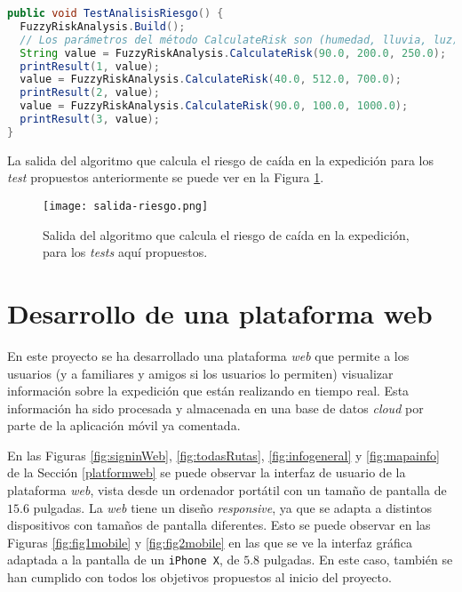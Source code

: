 \begin{lstlisting}[language=java,captionpos=t,caption={\textbf{Cálculo del riesgo de caída en una expedición, para unos valores de humedad, luz y lluvia dados.}},label={lst:hipotetica-riesgo}]
public void TestAnalisisRiesgo() {
  FuzzyRiskAnalysis.Build();
  // Los parámetros del método CalculateRisk son (humedad, lluvia, luz)
  String value = FuzzyRiskAnalysis.CalculateRisk(90.0, 200.0, 250.0);
  printResult(1, value);
  value = FuzzyRiskAnalysis.CalculateRisk(40.0, 512.0, 700.0);
  printResult(2, value);
  value = FuzzyRiskAnalysis.CalculateRisk(90.0, 100.0, 1000.0);
  printResult(3, value);
}
\end{lstlisting}

La salida del algoritmo que calcula el riesgo de caída en la expedición para los \textit{test} propuestos anteriormente se puede ver en la Figura \ref{fig:salida-riesgo}.

\begin{figure}[!h]
\begin{center}
\texttt{[image: salida-riesgo.png]}
\caption{Salida del algoritmo que calcula el riesgo de caída en la expedición, para los \textit{tests} aquí propuestos.}
\label{fig:salida-riesgo}
\end{center}
\end{figure}

\section{Desarrollo de una plataforma web}

En este proyecto se ha desarrollado una plataforma \textit{web} que permite a los usuarios (y a familiares y amigos si los usuarios lo permiten) visualizar información sobre la expedición que están realizando en tiempo real. Esta información ha sido procesada y almacenada en una base de datos \textit{cloud} por parte de la aplicación móvil ya comentada. 

En las Figuras \ref{fig:signinWeb}, \ref{fig:todasRutas}, \ref{fig:infogeneral} y \ref{fig:mapainfo} de la Sección \ref{platformweb} se puede observar la interfaz de usuario de la plataforma \textit{web}, vista desde un ordenador portátil con un tamaño de pantalla de $15.6$ pulgadas. La \textit{web} tiene un diseño \textit{responsive}, ya que se adapta a distintos dispositivos con tamaños de pantalla diferentes. Esto se puede observar en las Figuras \ref{fig:fig1mobile} y \ref{fig:fig2mobile} en las que se ve la interfaz gráfica adaptada a la pantalla de un \texttt{iPhone X}, de $5.8$ pulgadas. En este caso, también se han cumplido con todos los objetivos propuestos al inicio del proyecto.

